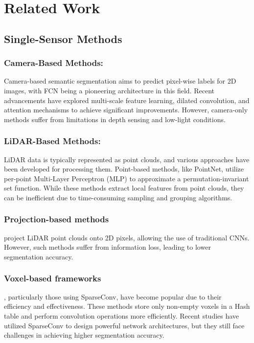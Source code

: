 \documentclass[10pt,twocolumn,letterpaper]{article}
\begin{document}
\section{Related Work}
\subsection{ Single-Sensor Methods
}

\subsubsection{Camera-Based Methods:}
Camera-based semantic segmentation aims to predict pixel-wise labels for 2D images, with FCN being a pioneering architecture in this field. Recent advancements have explored multi-scale feature learning, dilated convolution, and attention mechanisms to achieve significant improvements. However, camera-only methods suffer from limitations   in depth sensing and low-light conditions.

\subsubsection{LiDAR-Based Methods:}
LiDAR data is typically represented as point clouds, and various approaches have been developed for processing them. Point-based methods, like PointNet, utilize per-point Multi-Layer Perceptron (MLP) to approximate a permutation-invariant set function. While these methods extract local features from point clouds, they can be inefficient due to time-consuming sampling and grouping algorithms.

\subsubsection{Projection-based methods}
project LiDAR point clouds onto 2D pixels, allowing the use of traditional CNNs. However, such methods suffer from information loss, leading to lower segmentation accuracy.

\subsubsection{Voxel-based frameworks}
, particularly those using SparseConv, have become popular due to their efficiency and effectiveness. These methods store only non-empty voxels in a Hash table and perform convolution operations more efficiently. Recent studies have utilized SparseConv to design powerful network architectures, but they still face challenges in achieving higher segmentation accuracy.
\end{document}
